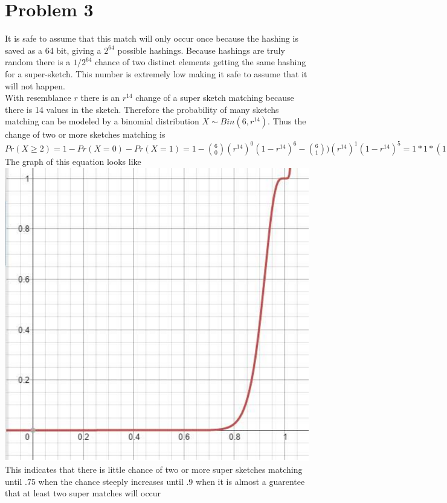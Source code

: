 \documentclass[11pt]{article}
\begin{document}
\section*{Problem 3}
It is safe to assume that this match will only occur once because the hashing is saved as a 64 bit, giving a $2^{64}$ possible hashings. Because hashings are truly random there is a $1/2^{64}$ chance of two distinct elements getting the same hashing for a super-sketch. This number is extremely low making it safe to assume that it will not happen. \\

With resemblance $r$ there is an $r^{14}$ change of a super sketch matching because there is 14 values in the sketch. Therefore the probability of many sketchs matching can be modeled by a binomial distribution $X \sim Bin(6,r^{14})$. Thus the change of two or more sketches matching is $Pr(X \geq 2) = 1 - Pr(X=0) - Pr(X=1) =1 - {6 \choose 0}(r^{14})^0(1-r^{14})^6 - {6 \choose 1})(r^{14})^1(1-r^{14})^5 = 1*1*(1-r^{14})^6 - 6*r^{14}(1-r^{14})^5$\\

The graph of this equation looks like \\

\includegraphics[scale=.75]{graph.png} \\
This indicates that there is little chance of two or more super sketches matching until .75 when the chance steeply increases until .9 when it is almost a guarentee that at least two super matches will occur
\end{document}

